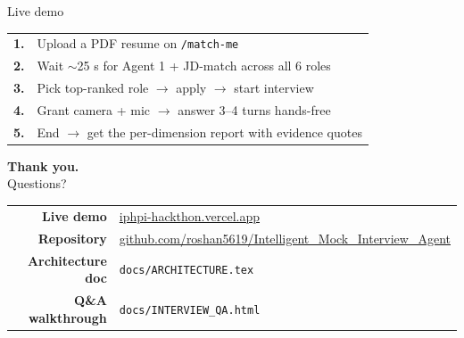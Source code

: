 \documentclass[aspectratio=169,10pt]{beamer}
\begin{document}
\begin{frame}{Live demo}
  \vspace{1.2cm}
  \centering
  \vspace{1.2cm}

  \footnotesize\color{slidefg!85}
  \begin{tabular}{rl}
    \textbf{\color{brandLite}1.}  & Upload a PDF resume on \texttt{/match-me} \\
    \textbf{\color{brandLite}2.}  & Wait $\sim$25 s for Agent 1 + JD-match across all 6 roles \\
    \textbf{\color{brandLite}3.}  & Pick top-ranked role $\rightarrow$ apply $\rightarrow$ start interview \\
    \textbf{\color{brandLite}4.}  & Grant camera + mic $\rightarrow$ answer 3--4 turns hands-free \\
    \textbf{\color{brandLite}5.}  & End $\rightarrow$ get the per-dimension report with evidence quotes \\
  \end{tabular}
\end{frame}

\begin{frame}[plain]
  \vspace{1.2cm}

  {\fontsize{60}{64}\selectfont\bfseries\color{white} Thank you.}\\[0.8em]
  {\LARGE\color{brandLite} Questions?}

  \vspace{3.2cm}
  \footnotesize\color{slidefg!75}
  \begin{tabular}{rl}
    \textbf{\color{brandLite}Live demo}  & \href{https://iphpi-hackthon.vercel.app}{iphpi-hackthon.vercel.app} \\
    \textbf{\color{brandLite}Repository} & \href{https://github.com/roshan5619/Intelligent_Mock_Interview_Agent}{github.com/roshan5619/Intelligent\_Mock\_Interview\_Agent} \\
    \textbf{\color{brandLite}Architecture doc} & \texttt{docs/ARCHITECTURE.tex} \\
    \textbf{\color{brandLite}Q\&A walkthrough} & \texttt{docs/INTERVIEW\_QA.html} \\
  \end{tabular}
\end{frame}
\end{document}
